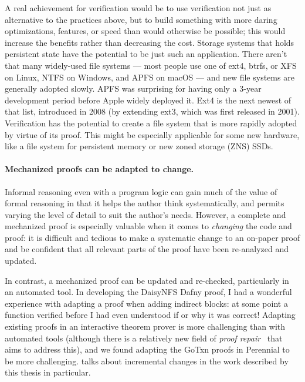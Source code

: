A real achievement for verification would be to use verification not just as
alternative to the practices above, but to build something with more daring optimizations,
features, or speed than would otherwise be possible; this would increase the
benefits rather than decreasing the cost. Storage systems that holds persistent
state have the potential to be just such an application. There aren't that many
widely-used
file systems --- most people use one of ext4, btrfs, or XFS on Linux, NTFS on
Windows, and APFS on macOS --- and new file systems are generally adopted
slowly. APFS was surprising for having only a 3-year development period before
Apple widely deployed it. Ext4 is the next newest of that list, introduced in
2008 (by extending ext3, which was first released in 2001). Verification has the
potential to create a file system that is more rapidly adopted by virtue of its
proof. This might be especially applicable for some new hardware, like a file
system for persistent memory or new zoned storage (ZNS) SSDs.


\paragraph{Mechanized proofs can be adapted to change.} Informal
reasoning even with a program logic can gain much of the value of formal
reasoning in that it helps the author think systematically, and permits varying
the level of detail to suit the author's needs. However, a complete and
mechanized proof is especially valuable when it comes to \emph{changing} the
code and proof: it is difficult and tedious to make a systematic change to an
on-paper proof and be confident that all relevant parts of the proof have been
re-analyzed and updated.

In contrast, a mechanized proof can be updated and re-checked, particularly in
an automated tool. In developing the DaisyNFS Dafny proof, I had a wonderful
experience with adapting a proof when adding indirect blocks: at some point a
function verified before I had even understood if or why it was correct!
Adapting existing proofs in an interactive theorem prover is more challenging
than with automated tools (although there is a relatively new field of \emph{proof
repair}~\cite{ringer:proof-repair} that aims to address this), and we found
adapting the GoTxn proofs in Perennial to be more challenging.
 talks about incremental changes in the work
described by this thesis in particular.

